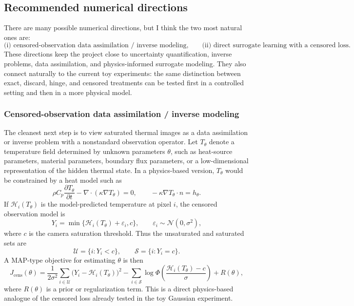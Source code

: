 
\subsection{Recommended numerical directions}

There are many possible numerical directions, but I think the two most natural
ones are:
\[
    \text{(i) censored-observation data assimilation / inverse modeling,}
    \qquad
    \text{(ii) direct surrogate learning with a censored loss.}
\]
These directions keep the project close to uncertainty quantification,
inverse problems, data assimilation, and physics-informed surrogate modeling.
They also connect naturally to the current toy experiments: the same distinction
between exact, discard, hinge, and censored treatments can be tested first in a
controlled setting and then in a more physical model.

\subsubsection{Censored-observation data assimilation / inverse modeling}

The cleanest next step is to view saturated thermal images as a data assimilation
or inverse problem with a nonstandard observation operator.  Let $T_\theta$
denote a temperature field determined by unknown parameters $\theta$, such as
heat-source parameters, material parameters, boundary flux parameters, or a
low-dimensional representation of the hidden thermal state.  In a physics-based
version, $T_\theta$ would be constrained by a heat model such as
\[
    \rho C_p \frac{\partial T_\theta}{\partial t}
    - \nabla\cdot(\kappa\nabla T_\theta)=0,
    \qquad
    -\kappa\nabla T_\theta\cdot n = h_\theta .
\]
If $\mathcal H_i(T_\theta)$ is the model-predicted temperature at pixel $i$,
the censored observation model is
\[
    Y_i = \min\{\mathcal H_i(T_\theta)+\varepsilon_i,c\},
    \qquad
    \varepsilon_i\sim\mathcal N(0,\sigma^2),
\]
where $c$ is the camera saturation threshold.  Thus the unsaturated and saturated
sets are
\[
    \mathcal U=\{i:Y_i<c\},\qquad
    \mathcal S=\{i:Y_i=c\}.
\]
A MAP-type objective for estimating $\theta$ is then
\[
    J_{\mathrm{cens}}(\theta)
    =
    \frac{1}{2\sigma^2}\sum_{i\in\mathcal U}
        \bigl(Y_i-\mathcal H_i(T_\theta)\bigr)^2
    -
    \sum_{i\in\mathcal S}
        \log \Phi\!\left(
        \frac{\mathcal H_i(T_\theta)-c}{\sigma}
        \right)
    + R(\theta),
\]
where $R(\theta)$ is a prior or regularization term.  This is a direct
physics-based analogue of the censored loss already tested in the toy Gaussian
experiment.

